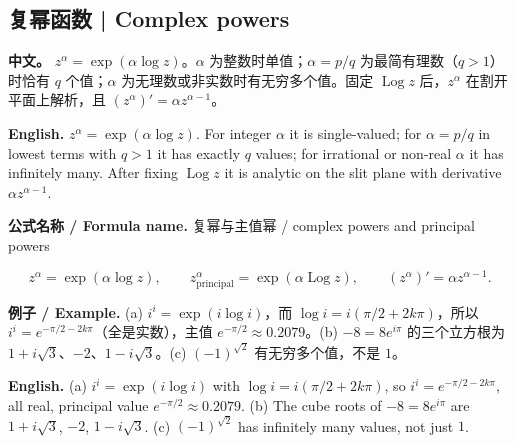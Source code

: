 \documentclass[UTF8,11pt,a4paper]{ctexart}
\newcommand{\EN}[1]{\par\noindent \textbf{English.} #1\par}
\newcommand{\FORMULA}[2]{\par\noindent\textbf{公式名称 / Formula name.} #1 / #2\par}
\newcommand{\EX}[2]{\par\noindent \textbf{例子 / Example.} #1\par\EN{#2}}
\newcommand{\APS}[2]{\par\noindent\textbf{中文。} #1\par\noindent\textbf{English.} #2\par\smallskip}
\begin{document}
\subsection{复幂函数 | Complex powers}
\APS{$z^\alpha=\exp(\alpha\log z)$。$\alpha$ 为整数时单值；$\alpha=p/q$ 为最简有理数（$q>1$）时恰有 $q$ 个值；$\alpha$ 为无理数或非实数时有无穷多个值。固定 $\operatorname{Log}z$ 后，$z^\alpha$ 在割开平面上解析，且 $(z^\alpha)'=\alpha z^{\alpha-1}$。}{$z^\alpha=\exp(\alpha\log z)$. For integer $\alpha$ it is single-valued; for $\alpha=p/q$ in lowest terms with $q>1$ it has exactly $q$ values; for irrational or non-real $\alpha$ it has infinitely many. After fixing $\operatorname{Log}z$ it is analytic on the slit plane with derivative $\alpha z^{\alpha-1}$.}
\FORMULA{复幂与主值幂}{complex powers and principal powers}
\[
z^\alpha=\exp(\alpha\log z),\qquad
z^\alpha_{\text{principal}}=\exp(\alpha\operatorname{Log}z),\qquad
(z^\alpha)'=\alpha z^{\alpha-1}.
\]
\EX{(a) $i^i=\exp(i\log i)$，而 $\log i=i(\pi/2+2k\pi)$，所以 $i^i=e^{-\pi/2-2k\pi}$（全是实数），主值 $e^{-\pi/2}\approx0.2079$。(b) $-8=8e^{i\pi}$ 的三个立方根为 $1+i\sqrt3$、$-2$、$1-i\sqrt3$。(c) $(-1)^{\sqrt2}$ 有无穷多个值，不是 $1$。}{(a) $i^i=\exp(i\log i)$ with $\log i=i(\pi/2+2k\pi)$, so $i^i=e^{-\pi/2-2k\pi}$, all real, principal value $e^{-\pi/2}\approx0.2079$. (b) The cube roots of $-8=8e^{i\pi}$ are $1+i\sqrt3$, $-2$, $1-i\sqrt3$. (c) $(-1)^{\sqrt2}$ has infinitely many values, not just $1$.}
\end{document}
